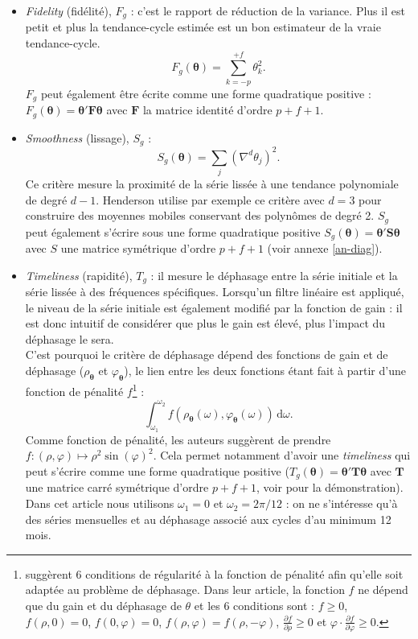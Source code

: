 \documentclass[
  12pt,
  a4paper,french]{article}
\newcommand\1{\mathds{1}}
\newcommand\ud{\,\mathrm{d}}
\begin{document}
\begin{itemize}
\item
  \emph{Fidelity} (fidélité), \(F_g\) : c'est le rapport de réduction de la variance.
  Plus il est petit et plus la tendance-cycle estimée est un bon estimateur de la vraie tendance-cycle.
  \[
  F_g(\boldsymbol \theta) = \sum_{k=-p}^{+f}\theta_{k}^{2}.
  \]
  \(F_g\) peut également être écrite comme une forme quadratique positive : \(F_g(\boldsymbol \theta)=\boldsymbol \theta'\boldsymbol F\boldsymbol \theta\) avec \(\boldsymbol F\) la matrice identité d'ordre \(p+f+1\).
\item
  \emph{Smoothness} (lissage), \(S_g\) :
  \[
  S_g(\boldsymbol\theta) = \sum_{j}(\nabla^{d}\theta_{j})^{2}.
  \]
  Ce critère mesure la proximité de la série lissée à une tendance polynomiale de degré \(d-1\).
  Henderson utilise par exemple ce critère avec \(d=3\) pour construire des moyennes mobiles conservant des polynômes de degré 2.
  \(S_g\) peut également s'écrire sous une forme quadratique positive \(S_g(\boldsymbol \theta)=\boldsymbol \theta'\boldsymbol S\boldsymbol \theta\) avec \(S\) une matrice symétrique d'ordre \(p+f+1\) (voir annexe \ref{an-diag}).
\item
  \emph{Timeliness} (rapidité), \(T_g\) : il mesure le déphasage entre la série initiale et la série lissée à des fréquences spécifiques.
  Lorsqu'un filtre linéaire est appliqué, le niveau de la série initiale est également modifié par la fonction de gain : il est donc intuitif de considérer que plus le gain est élevé, plus l'impact du déphasage le sera.\\
  C'est pourquoi le critère de déphasage dépend des fonctions de gain et de déphasage (\(\rho_{\boldsymbol\theta}\) et \(\varphi_{\boldsymbol\theta}\)), le lien entre les deux fonctions étant fait à partir d'une fonction de pénalité \(f\)\footnote{
    \textcite{ch15HBSA} suggèrent 6 conditions de régularité à la fonction de pénalité afin qu'elle soit adaptée au problème de déphasage.
    Dans leur article, la fonction \(f\) ne dépend que du gain et du déphasage de \(\theta\) et les 6 conditions sont : \(f \geq 0\), \(f\left(\rho,0\right)=0\), \(f\left(0,\varphi\right)=0\), \(f\left(\rho,\varphi\right)=f\left(\rho,-\varphi\right)\), \(\frac{\partial f}{\partial \rho} \geq 0\) et
    \(\varphi \cdot \frac{\partial f}{\partial \varphi} \geq 0\).} :
  \[
  \int_{\omega_{1}}^{\omega_{2}}f(\rho_{\boldsymbol\theta}(\omega),\varphi_{\boldsymbol\theta}(\omega))\ud\omega.
  \]
  Comme fonction de pénalité, les auteurs suggèrent de prendre \(f\colon(\rho,\varphi)\mapsto\rho^2\sin(\varphi)^2\).
  Cela permet notamment d'avoir une \emph{timeliness} qui peut s'écrire comme une forme quadratique positive (\(T_g(\boldsymbol \theta)=\boldsymbol \theta'\boldsymbol T\boldsymbol \theta\) avec \(\boldsymbol T\) une matrice carré symétrique d'ordre \(p+f+1\), voir \textcite{ch15HBSA} pour la démonstration).
  Dans cet article nous utilisons \(\omega_1=0\) et \(\omega_2=2\pi/12\) : on ne s'intéresse qu'à des séries mensuelles et au déphasage associé aux cycles d'au minimum 12 mois.
\end{itemize}
\end{document}
